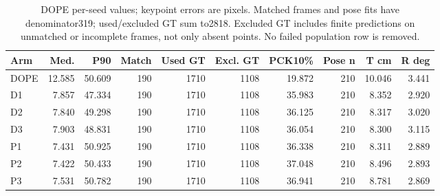 \begin{table}[t]\centering\small
\caption{DOPE per-seed values; keypoint errors are pixels. Matched frames and pose fits have denominator319; used/excluded GT sum to2818. Excluded GT includes finite predictions on unmatched or incomplete frames, not only absent points. No failed population row is removed.}\label{tab:dopefull}
\begin{tabular}{lrrrrrrrrr}\toprule
Arm & Med. & P90 & Match & Used GT & Excl. GT & PCK10\% & Pose n & T cm & R deg\\\midrule
DOPE & 12.585 & 50.609 & 190 & 1710 & 1108 & 19.872 & 210 & 10.046 & 3.441\\
D1 & 7.857 & 47.334 & 190 & 1710 & 1108 & 35.983 & 210 & 8.352 & 2.920\\
D2 & 7.840 & 49.298 & 190 & 1710 & 1108 & 36.125 & 210 & 8.317 & 3.020\\
D3 & 7.903 & 48.831 & 190 & 1710 & 1108 & 36.054 & 210 & 8.300 & 3.115\\
P1 & 7.431 & 50.925 & 190 & 1710 & 1108 & 36.338 & 210 & 8.311 & 2.889\\
P2 & 7.422 & 50.433 & 190 & 1710 & 1108 & 37.048 & 210 & 8.496 & 2.893\\
P3 & 7.531 & 50.782 & 190 & 1710 & 1108 & 36.941 & 210 & 8.781 & 2.869\\
\bottomrule\end{tabular}
\end{table}
